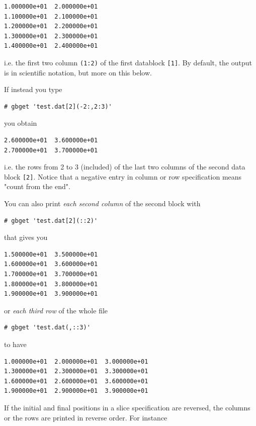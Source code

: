 \documentclass[11pt]{article}
\begin{document}
\begin{verbatim}
1.000000e+01  2.000000e+01
1.100000e+01  2.100000e+01
1.200000e+01  2.200000e+01
1.300000e+01  2.300000e+01
1.400000e+01  2.400000e+01
\end{verbatim}

i.e. the first two column \verb~(1:2)~ of the first datablock \verb~[1]~. By
default, the output is in scientific notation, but more on this below.

If instead you type

\begin{verbatim}
# gbget 'test.dat[2](-2:,2:3)'
\end{verbatim}

you obtain

\begin{verbatim}
2.600000e+01  3.600000e+01
2.700000e+01  3.700000e+01
\end{verbatim}

i.e. the rows from 2 to 3 (included) of the last two columns of the
second data block \verb~[2]~. Notice that a negative entry in column or row
specification means "count from the end".

You can also print \emph{each second column} of the second block with

\begin{verbatim}
# gbget 'test.dat[2](::2)'
\end{verbatim}

that gives you

\begin{verbatim}
1.500000e+01  3.500000e+01
1.600000e+01  3.600000e+01
1.700000e+01  3.700000e+01
1.800000e+01  3.800000e+01
1.900000e+01  3.900000e+01
\end{verbatim}

or \emph{each third row} of the whole file

\begin{verbatim}
# gbget 'test.dat(,::3)'
\end{verbatim}

to have

\begin{verbatim}
1.000000e+01  2.000000e+01  3.000000e+01
1.300000e+01  2.300000e+01  3.300000e+01
1.600000e+01  2.600000e+01  3.600000e+01
1.900000e+01  2.900000e+01  3.900000e+01
\end{verbatim}

If the initial and final positions in a slice specification are
reversed, the columns or the rows are printed in reverse order. For
instance
\end{document}
